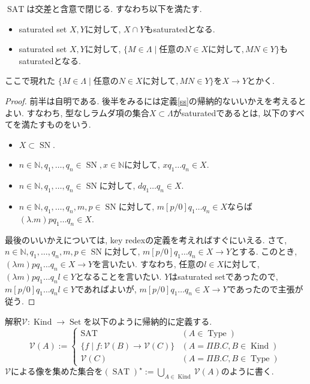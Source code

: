 \documentclass[12pt, titlepage]{ltjsarticle}
\DeclareMathOperator{\SN}{SN}
\DeclareMathOperator{\Type}{Type}
\DeclareMathOperator{\Kind}{Kind}
\DeclareMathOperator{\SAT}{SAT}
\DeclareMathOperator{\Set}{Set}
\begin{document}
\begin{lem}
 $\SAT$は交差と含意で閉じる. すなわち以下を満たす.
 \begin{itemize}
  \item saturated set $X, Y$に対して, $X \cap Y$もsaturatedとなる.
  \item saturated set $X, Y$に対して, $\{ M \in \Lambda \mid \text{任意の} N \in X \text{に対して}, M N \in Y\}$もsaturatedとなる.
 \end{itemize}
 ここで現れた $\{ M \in \Lambda \mid \text{任意の} N \in X \text{に対して}, M N \in Y\}$を$X \rightarrow Y$とかく.
\end{lem}
\begin{proof}
 前半は自明である.
 後半をみるには定義\ref{ss}の帰納的ないいかえを考えるとよい. すなわち, 
 型なしラムダ項の集合$X \subset \Lambda$がsaturatedであるとは, 以下のすべてを満たすものをいう.
 \begin{itemize}
  \item $X \subset \SN$.
  \item $n \in \mathbb{N}, q_1, \ldots, q_n \in \SN, x \in \mathbb{N}$に対して, $x q_1 \ldots q_n \in X$.
  \item $n \in \mathbb{N}, q_1, \ldots, q_n \in \SN$に対して, $d q_1 \ldots q_n \in X$.
  \item $n \in \mathbb{N}, q_1, \ldots, q_n, m, p \in \SN$に対して, $m[p/0]q_1 \ldots q_n \in X$ならば$(\lambda . m)p q_1 \ldots q_n \in X$.
 \end{itemize}
最後のいいかえについては, key redexの定義を考えればすぐにいえる.
さて, $n \in \mathbb{N}, q_1, \ldots, q_n, m, p \in \SN$に対して, $m[p/0]q_1 \ldots q_n \in X \rightarrow Y$とする. このとき, $(\lambda m)p q_1 \ldots q_n \in X \rightarrow Y$を言いたい.
すなわち, 任意の$l \in X$に対して, $(\lambda m)p q_1 \ldots q_n l \in Y$となることを言いたい.
 $Y$はsaturated setであったので, $m[p/0] q_1 \ldots q_n l \in Y$であればよいが, $m[p/0]q_1 \ldots q_n \in X \rightarrow Y$であったので主張が従う.
\end{proof}

\begin{defn}
 解釈$\mathcal{V} : \Kind \rightarrow \Set$を以下のように帰納的に定義する. 
\[
  \mathcal{V} (A) := \begin{cases}
    \SAT & (A \in \Type) \\
    \{ f \mid f : \mathcal{V}(B) \rightarrow \mathcal{V}(C) \} & (A = \Pi B. C, B \in \Kind) \\
    \mathcal{V} (C) & (A = \Pi B. C, B \in \Type)
  \end{cases}
\]
 $\mathcal{V}$による像を集めた集合を$(\SAT)^\star := \bigcup_{A \in \Kind} \mathcal{V}(A)$のように書く.
\end{defn}
\end{document}
